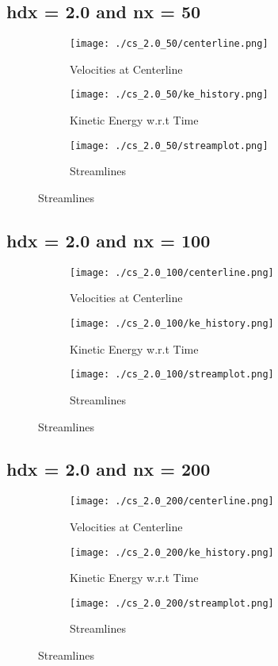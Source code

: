 \documentclass[12pt, a4paper]{report}
\begin{document}
\subsection{hdx = 2.0 and nx = 50}
\begin{figure}[H]
\begin{subfigure}{0.5\textwidth}
	\texttt{[image: ./cs\_2.0\_50/centerline.png]}
	\caption{Velocities at Centerline}
\end{subfigure}
\begin{subfigure}{0.5\textwidth}
	\texttt{[image: ./cs\_2.0\_50/ke\_history.png]}
	\caption{Kinetic Energy w.r.t Time}
\end{subfigure}
\medskip
\begin{subfigure}{\textwidth}
	\centering
	\texttt{[image: ./cs\_2.0\_50/streamplot.png]}
	\caption{Streamlines}
\end{subfigure}
\end{figure}

\subsection{hdx = 2.0 and nx = 100}
\begin{figure}[H]
\begin{subfigure}{0.5\textwidth}
	\texttt{[image: ./cs\_2.0\_100/centerline.png]}
	\caption{Velocities at Centerline}
\end{subfigure}
\begin{subfigure}{0.5\textwidth}
	\texttt{[image: ./cs\_2.0\_100/ke\_history.png]}
	\caption{Kinetic Energy w.r.t Time}
\end{subfigure}
\medskip
\begin{subfigure}{\textwidth}
	\texttt{[image: ./cs\_2.0\_100/streamplot.png]}
	\caption{Streamlines}
\end{subfigure}
\end{figure}

\subsection{hdx = 2.0 and nx = 200}
\begin{figure}[H]
\begin{subfigure}{0.5\textwidth}
	\texttt{[image: ./cs\_2.0\_200/centerline.png]}
	\caption{Velocities at Centerline}
\end{subfigure}
\begin{subfigure}{0.5\textwidth}
	\texttt{[image: ./cs\_2.0\_200/ke\_history.png]}
	\caption{Kinetic Energy w.r.t Time}
\end{subfigure}
\medskip
\begin{subfigure}{\textwidth}
	\texttt{[image: ./cs\_2.0\_200/streamplot.png]}
	\caption{Streamlines}
\end{subfigure}
\end{figure}
\end{document}
